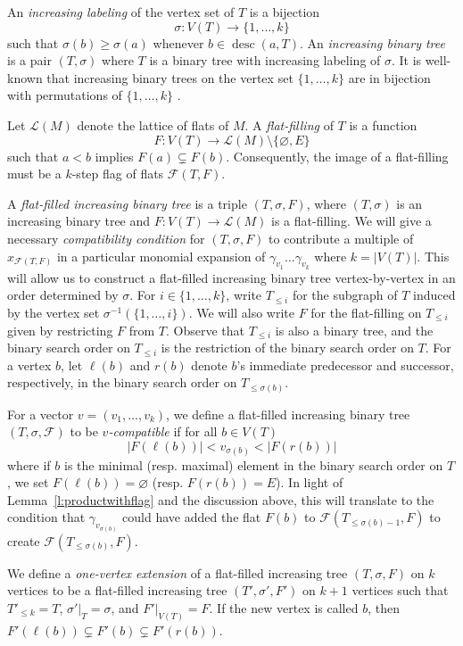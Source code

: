 \documentclass[ALCO,published]{cedram}
\numberwithin{equation}{section}
\numberwithin{figure}{section}
\newcommand{\cF}{\mathcal{F}}
\newcommand{\cL}{\mathcal{L}}
\DeclareMathOperator{\desc}{desc}
\begin{document}
An \emph{increasing labeling} of the vertex set of $T$ is a bijection
\[\sigma\colon V(T) \to \{1,\dots,k\}\]
such that $\sigma(b)\geq \sigma(a)$ whenever $b\in\desc(a,T)$.
An \emph{increasing binary tree} is a pair $(T,\sigma)$ where $T$ is a binary tree with increasing labeling of $\sigma$. It is well-known that increasing binary trees on the vertex set $\{1, \ldots, k\}$ are in bijection with permutations of $\{1, \ldots, k\}$ \cite[Section 1.5]{Stanley}.

Let $\cL(M)$ denote the lattice of flats of $M$. A {\em flat-filling} of $T$ is a function
\[F\colon V(T)\to \cL(M)\setminus\{\varnothing, E\}\]
such that $a<b$ implies $F(a)\subsetneq F(b)$. Consequently, the image of a flat-filling must be a $k$-step flag of flats $\cF(T,F)$.

A {\em flat-filled increasing binary tree} is a triple $(T,\sigma,F)$, where $(T,\sigma)$ is an increasing binary tree and $F\colon V(T)\to \cL(M)$ 
 is a flat-filling. We will give a necessary {\em compatibility condition} for $(T,\sigma,F)$ to contribute a multiple of $x_{\cF(T,F)}$ in a particular monomial expansion of $\gamma_{v_1}\dots\gamma_{v_k}$ where $k=|V(T)|$. This will allow us to construct a flat-filled increasing binary tree vertex-by-vertex in an order determined by $\sigma$. 
For $i \in \{1,\ldots,k\}$, write $T_{\leq i}$ for the subgraph of $T$ induced by the vertex set $\sigma^{-1}(\{1,\ldots,i\})$. We will also write $F$ for the flat-filling on $T_{\leq i}$ given by restricting $F$ from $T$.
Observe that $T_{\leq i}$ is also a binary tree, and the binary search order on $T_{\leq i}$ is the restriction of the binary search order on $T$. For a vertex $b$, let $\ell(b)$ and $r(b)$ denote $b$'s immediate predecessor and successor, respectively, in the binary search order on $T_{\leq \sigma(b)}$.

For a vector $v = (v_1, \ldots, v_k)$, we define a flat-filled increasing binary tree $(T,\sigma,\cF)$ to be {\em $v$-compatible} if for all $b\in V(T)$
\[ |F(\ell(b))| < v_{\sigma(b)} < |F(r(b))|\]
where if $b$ is the minimal (resp. maximal) element in the binary search order on $T$, we set $F(\ell(b))=\varnothing$ (resp. $F(r(b))=E$).
In light of Lemma~\ref{l:productwithflag} and the discussion above, this will translate to the condition that $\gamma_{v_{\sigma(b)}}$ could have added the flat $F(b)$ to $\cF(T_{\leq \sigma(b)-1},F)$ to create $\cF(T_{\leq \sigma(b)},F)$.

We define a {\em one-vertex extension} of a flat-filled increasing tree $(T,\sigma,F)$ on $k$ vertices to be a flat-filled increasing tree $(T',\sigma',F')$ on $k+1$ vertices such that $T'_{\leq k} = T$, $\sigma'|_T = \sigma$, and $F'|_{V(T)} = F$.
If the new vertex is called $b$, then $F'(\ell(b))\subsetneq F'(b)\subsetneq F'(r(b))$.
\end{document}
